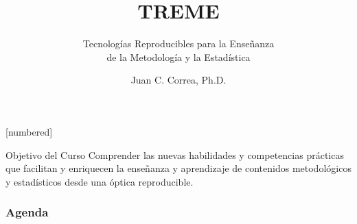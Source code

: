 \documentclass{beamer}
\begin{document}



\author[Juan C. Correa \textcolor{white}{(\url{https://correajc.com}})]{Juan C. Correa, Ph.D.}
\title[TREME]{TREME}
\subtitle{Tecnologías Reproducibles para la Enseñanza \\de la Metodología y la Estadística}
[numbered]
\date[Bogotá, Mayo-2021]{}


\begin{frame}
	\titlepage
\end{frame}

\begin{frame}
\begin{block}{Objetivo del Curso}
\vspace{0.3cm}
Comprender las nuevas habilidades y competencias prácticas que facilitan y enriquecen la enseñanza y aprendizaje de contenidos metodológicos y estadísticos desde una óptica reproducible.  
\end{block}
\end{frame}

\begin{frame}
\frametitle{Agenda} 
\tableofcontents
\end{frame}


\end{document}
